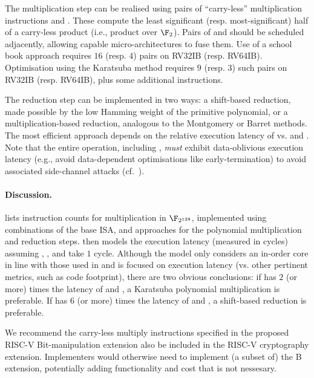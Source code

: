The multiplication step 
can be realised using pairs of ``carry-less'' multiplication instructions
 and .
These compute the least significant (resp. most-significant) 
half of a carry-less product (i.e., product over $\F_2$).
Pairs of 
 and 
should be scheduled adjacently, allowing capable micro-architectures
to fuse them.
Use of a school book approach 
requires
$16$ (resp. $4$) pairs 
on RV32IB (resp. RV64IB).
Optimisation using the Karatsuba method
requires
$ 9$ (resp. $3$) such pairs 
on RV32IB (resp. RV64IB),
plus some additional  instructions.

The reduction step
can be implemented in two ways:
a shift-based reduction, made possible by the low Hamming weight of the
primitive polynomial,
or
a multiplication-based reduction, analogous to the Montgomery or Barret
methods.
The most efficient approach depends on the relative execution 
latency of
vs.
 and .
Note that the entire  operation, including ,
{\em must} exhibit data-oblivious execution latency 
(e.g., avoid data-dependent optimisations like early-termination)
to avoid associated side-channel attacks (cf.~\cite{GOPT:09}).


\paragraph{Discussion.}

lists instruction counts for 
multiplication in $\F_{2^{128}}$,
implemented using combinations of the base ISA, and approaches
for the polynomial multiplication and reduction steps.
then models the execution latency 
(measured in cycles)
assuming , , and  take $1$ cycle.
Although the model only considers an in-order core in line with those used
in  and is focused on execution latency
(vs. other pertinent metrics, such as code footprint),
there are two obvious conclusions:
if
has $2$ (or more) times the latency of
 and ,
a 
Karatsuba
polynomial multiplication
is preferable.
If
has $6$ (or more) times the latency of
 and ,
a shift-based 
reduction 
is preferable.

We recommend the carry-less multiply instructions
specified in the proposed RISC-V Bit-manipulation extension also be included
in the RISC-V cryptography extension.
Implementers would otherwise need to implement (a subset of) the B
extension, potentially adding functionality and cost that is not
nessesary.

